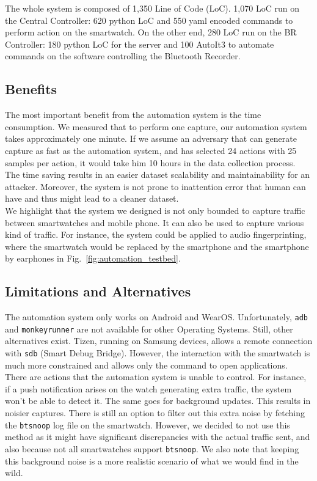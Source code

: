 The whole system is composed of 1,350 Line of Code (LoC). 1,070 LoC run on the Central Controller: 620 python LoC and 550 yaml encoded commands to perform action on the smartwatch. On the other end, 280 LoC run on the BR Controller: 180 python LoC for the server and 100 AutoIt3 to automate commands on the software controlling the Bluetooth Recorder.

\subsection{Benefits}
The most important benefit from the automation system is the time consumption. We measured that to perform one capture, our automation system takes approximately one minute. If we assume an adversary that can generate capture as fast as the automation system, and has selected 24 actions with 25 samples per action, it would take him 10 hours in the data collection process. The time saving results in an easier dataset scalability and maintainability for an attacker. Moreover, the system is not prone to inattention error that human can have and thus might lead to a cleaner dataset. 
\\

We highlight that the system we designed is not only bounded to capture traffic between smartwatches and mobile phone. It can also be used to capture various kind of traffic. For instance, the system could be applied to audio fingerprinting, where the smartwatch would be replaced by the smartphone and the smartphone by earphones in Fig.~\ref{fig:automation_testbed}.

\subsection{Limitations and Alternatives}
The automation system only works on Android and WearOS. Unfortunately, \texttt{adb} and \texttt{monkeyrunner} are not available for other Operating Systems. Still, other alternatives exist. Tizen, running on Samsung devices, allows a remote connection with \texttt{sdb} (Smart Debug Bridge). However, the interaction with the smartwatch is much more constrained and allows only the command to open applications. 
\\


There are actions that the automation system is unable to control. For instance, if a push notification arises on the watch generating extra traffic, the system won't be able to detect it. The same goes for background updates. This results in noisier captures. There is still an option to filter out this extra noise by fetching the \texttt{btsnoop} log file on the smartwatch. However, we decided to not use this method as it might have significant discrepancies with the actual traffic sent, and also because not all smartwatches support \texttt{btsnoop}. We also note that keeping this background noise is a more realistic scenario of what we would find in the wild.
\\


